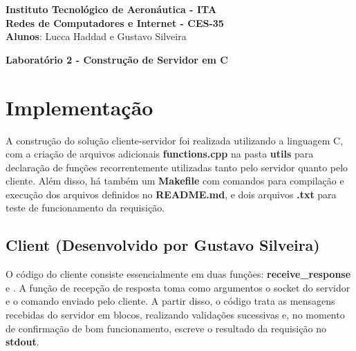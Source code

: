 \documentclass[brazil, 12pt]{article}
\begin{document}
\begin{center}
\textbf{Instituto Tecnológico de Aeronáutica - ITA} \\
\textbf{Redes de Computadores e Internet - CES-35} \\
\textbf{Alunos}: Lucca Haddad e Gustavo Silveira
\end{center}

\begin{center}
\textbf{Laboratório 2 - Construção de Servidor em C}
\end{center}
\vspace*{0.5cm}

\section{Implementação}

	A construção do solução cliente-servidor foi realizada utilizando a linguagem C, com a criação de arquivos adicionais \textbf{functions.cpp} na pasta \textbf{utils} para declaração de funções recorrentemente utilizadas tanto pelo servidor quanto pelo cliente. Além disso, há também um \textbf{Makefile} com comandos para compilação e execução dos arquivos definidos no \textbf{README.md}, e dois arquivos \textbf{.txt} para teste de funcionamento da requisição.

	\subsection{Client (Desenvolvido por Gustavo Silveira)}
	
		O código do cliente consiste essencialmente em duas funções: \textbf{receive\_response} e . A função de recepção de resposta toma como argumentos o socket do servidor e o comando enviado pelo cliente. A partir disso, o código trata as mensagens recebidas do servidor em blocos, realizando validações sucessivas e, no momento de confirmação de bom funcionamento, escreve o resultado da requisição no \textbf{stdout}.
		
\end{document}
